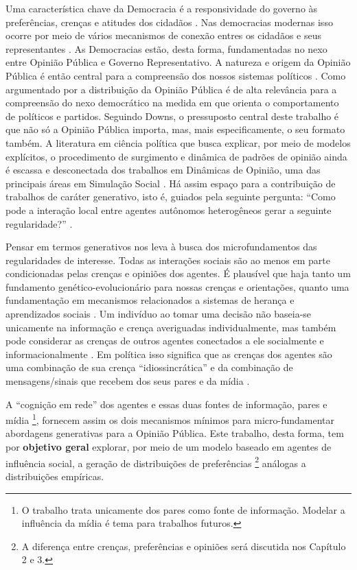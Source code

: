 Uma característica chave da Democracia é a responsividade do governo às
preferências, crenças e atitudes dos cidadãos
\cite{dahl1989democracy,bartels2003democracy}. Nas democracias modernas isso
ocorre por meio de vários mecanismos de conexão entres os cidadãos e seus
representantes \cite{dahl1989democracy, schumpeter2013capitalism}. As
Democracias estão, desta forma, fundamentadas no nexo entre Opinião Pública e
Governo Representativo. A natureza e origem da Opinião Pública é então central
para a compreensão dos nossos sistemas políticos \cite{berelson1952democratic}.
Como argumentado por  a distribuição da Opinião
Pública é de alta relevância para a compreensão do nexo democrático na medida em
que orienta o comportamento de políticos e partidos. Seguindo Downs, o
pressuposto central deste trabalho é que não só a Opinião Pública importa, mas,
mais especificamente, o seu formato também. A literatura em ciência política que
busca explicar, por meio de modelos explícitos, o procedimento de surgimento e
dinâmica de padrões de opinião ainda é escassa e desconectada dos trabalhos em
Dinâmicas de Opinião, uma das principais áreas em Simulação Social
\cite{lorenz2017modeling, laver2011party, hauke2017recent}. Há assim espaço para
a contribuição de trabalhos de caráter generativo, isto é, guiados pela seguinte
pergunta: ``Como pode a interação local entre agentes autônomos heterogêneos
gerar a seguinte regularidade?'' \cite{epstein2006generative}.

Pensar em termos generativos nos leva à busca dos microfundamentos das
regularidades de interesse. Todas as interações sociais são ao menos em parte
condicionadas pelas crenças e opiniões dos agentes. É plausível que haja tanto
um fundamento genético-evolucionário para nossas crenças e orientações, quanto
uma fundamentação em mecanismos relacionados a sistemas de herança e
aprendizados sociais \cite{jablonka2014evolution, fowler2008biology,
fowler2013defense}. Um indivíduo ao tomar uma decisão não baseia-se unicamente
na informação e crença averiguadas individualmente, mas também pode considerar
as crenças de outros agentes conectados a ele socialmente e informacionalmente
\cite{gintis2016individuality}. Em política isso significa que as crenças dos
agentes são uma combinação de sua crença ``idiossincrática'' e da combinação de
mensagens/sinais que recebem dos seus pares e da mídia
\cite{barabas2004deliberation,ryan2011social}.

A ``cognição em rede'' \cite{gintis2016individuality} dos agentes e essas duas
fontes de informação, pares e mídia \footnote{O trabalho trata unicamente dos
pares como fonte de informação. Modelar a influência da mídia é tema para
trabalhos futuros.}, fornecem assim os dois mecanismos mínimos para
micro-fundamentar abordagens generativas para a Opinião Pública. Este trabalho,
desta forma, tem por \textbf{objetivo geral} explorar, por meio de um modelo
baseado em agentes de influência social, a geração de distribuições de
preferências \footnote{A diferença entre crenças, preferências e opiniões será
discutida nos Capítulo 2 e 3.} análogas a distribuições empíricas.

